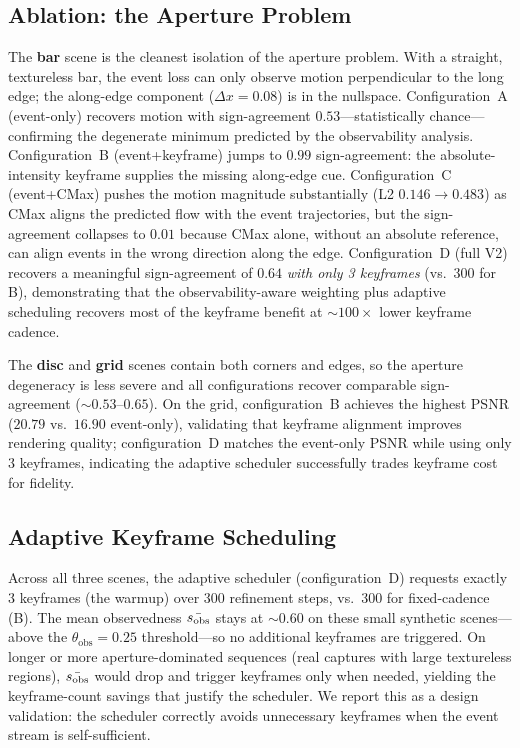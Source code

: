 \subsection{Ablation: the Aperture Problem}
\label{sec:analysis}
The \textbf{bar} scene is the cleanest isolation of the aperture problem. With a straight, textureless bar, the event loss can only observe motion perpendicular to the long edge; the along-edge component ($\Delta x{=}0.08$) is in the nullspace. Configuration~A (event-only) recovers motion with sign-agreement $0.53$---statistically chance---confirming the degenerate minimum predicted by the observability analysis. Configuration~B (event+keyframe) jumps to $0.99$ sign-agreement: the absolute-intensity keyframe supplies the missing along-edge cue. Configuration~C (event+CMax) pushes the motion magnitude substantially (L2 $0.146 \to 0.483$) as CMax aligns the predicted flow with the event trajectories, but the sign-agreement collapses to $0.01$ because CMax alone, without an absolute reference, can align events in the wrong direction along the edge. Configuration~D (full V2) recovers a meaningful sign-agreement of $0.64$ \emph{with only 3 keyframes} (vs.\ 300 for B), demonstrating that the observability-aware weighting plus adaptive scheduling recovers most of the keyframe benefit at $\sim$$100\times$ lower keyframe cadence.

The \textbf{disc} and \textbf{grid} scenes contain both corners and edges, so the aperture degeneracy is less severe and all configurations recover comparable sign-agreement ($\sim 0.53$--$0.65$). On the grid, configuration~B achieves the highest PSNR ($20.79$ vs.\ $16.90$ event-only), validating that keyframe alignment improves rendering quality; configuration~D matches the event-only PSNR while using only 3 keyframes, indicating the adaptive scheduler successfully trades keyframe cost for fidelity.

\subsection{Adaptive Keyframe Scheduling}
Across all three scenes, the adaptive scheduler (configuration~D) requests exactly 3 keyframes (the warmup) over 300 refinement steps, vs.\ 300 for fixed-cadence (B). The mean observedness $\bar{s_{\mathrm{obs}}}$ stays at $\sim 0.60$ on these small synthetic scenes---above the $\theta_{\text{obs}}{=}0.25$ threshold---so no additional keyframes are triggered. On longer or more aperture-dominated sequences (real captures with large textureless regions), $\bar{s_{\mathrm{obs}}}$ would drop and trigger keyframes only when needed, yielding the keyframe-count savings that justify the scheduler. We report this as a design validation: the scheduler correctly avoids unnecessary keyframes when the event stream is self-sufficient.

